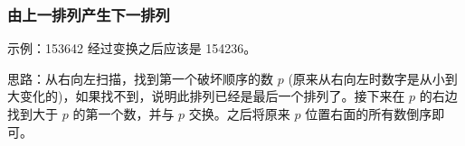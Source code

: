 \subsubsection{由上一排列产生下一排列}
	示例：153642 经过变换之后应该是 154236。
	
	思路：从右向左扫描，找到第一个破坏顺序的数 $p$ (原来从右向左时数字是从小到大变化的)，如果找不到，说明此排列已经是最后一个排列了。接下来在 $p$ 的右边找到大于 $p$ 的第一个数，并与 $p$ 交换。之后将原来 $p$ 位置右面的所有数倒序即可。
	
	